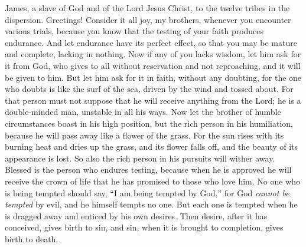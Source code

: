 
\begin{biblechapter} %
 James, a slave of God and of the Lord Jesus Christ, to the twelve tribes in the dispersion. Greetings!
 Consider it all joy, my brothers, whenever you encounter various trials,
\verse because you know that the testing of your faith produces endurance.
\verse And let endurance have its perfect effect, so that you may be mature and complete, lacking in nothing.
\verse Now if any of you lacks wisdom, let him ask for it from God, who gives to all without reservation and not reproaching, and it will be given to him.
\verse But let him ask for it in faith, without any doubting, for the one who doubts is like the surf of the sea, driven by the wind and tossed about.
\verse For that person must not suppose that he will receive anything from the Lord;
\verse he is a double-minded man, unstable in all his ways.
\verse Now let the brother of humble circumstances boast in his high position,
\verse but the rich person in his humiliation, because he will pass away like a flower of the grass.
\verse For the sun rises with its burning heat and dries up the grass, and its flower falls off, and the beauty of its appearance is lost. So also the rich person in his pursuits will wither away.
\verse Blessed is the person who endures testing, because when he is approved he will receive the crown of life that he has promised to those who love him.
\verse No one who is being tempted should say, “I am being tempted by God,” for God \textit{cannot be tempted} by evil, and he himself tempts no one.
\verse But each one is tempted when he is dragged away and enticed by his own desires.
\verse Then desire, after it has conceived, gives birth to sin, and sin, when it is brought to completion, gives birth to death.

\end{biblechapter}
